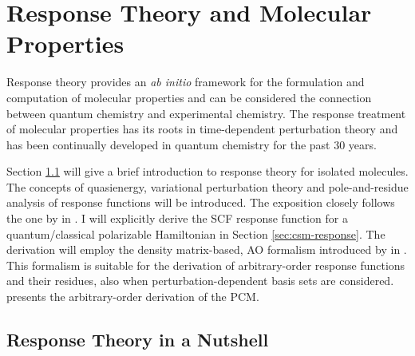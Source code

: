 \chapter{Response Theory and Molecular Properties}\label{ch:molprop}

\begin{epigraphs}
\end{epigraphs}

Response theory provides an \emph{ab initio} framework for the
formulation and computation of molecular properties and can be
considered the connection between quantum chemistry and experimental
chemistry.
The response treatment of molecular properties has its roots in
time-dependent perturbation theory\autocite{Konishi2009-zb} and has been
continually developed in quantum chemistry for the past 30
years.\autocite{Olsen1985-nr, Helgaker1992-ph, Olsen1995-pf,
Christiansen1998-pe, Norman2011-ad, Helgaker2012-cz, Pawlowski2015-sq}

Section \ref{sec:exact-response} will give a brief introduction to
response theory for isolated molecules. The concepts of
quasienergy,\autocite{Christiansen1998-pe} variational perturbation
theory\autocite{Helgaker1992-ph} and pole-and-residue
analysis of response functions\autocite{Olsen1985-nr} will be introduced.
The exposition closely follows the one by \citeauthor{Saue2002-ns}
in .
I will explicitly derive the \acrshort{SCF} response function for a
quantum/classical polarizable Hamiltonian in Section
\ref{sec:csm-response}. The derivation will employ the
density matrix-based, \acrshort{AO} formalism introduced by
\citeauthor{Thorvaldsen2008-sg} in .
This formalism is suitable for the derivation of arbitrary-order
response functions and their residues, also when perturbation-dependent
basis sets are considered.\autocite{Friese2015-kb, Friese2015-bu}
 presents the arbitrary-order derivation of the \acrshort{PCM}.

\section{Response Theory in a Nutshell}\label{sec:exact-response}

